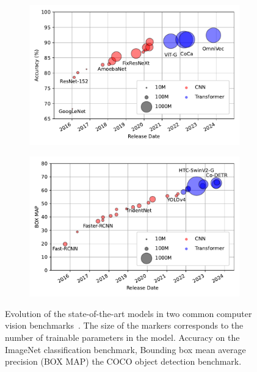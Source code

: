 \begin{figure}
    \centering
    \begin{subfigure}[b]{0.49\textwidth}
        \centering
        \includegraphics[width=\textwidth]{Figures/transformers/imagenet.pdf}
        \caption{}
        \label{fig:imagenet}
    \end{subfigure}
    \hfill
    \begin{subfigure}[b]{0.49\textwidth}
        \centering
        \includegraphics[width=\textwidth]{Figures/transformers/coco.pdf}
        \caption{}
        \label{fig:coco}
    \end{subfigure}
    \caption{Evolution of the state-of-the-art models in two common computer vision benchmarks~\cite{paperswithcode}. The size of the markers corresponds to the number of trainable parameters in the model.  Accuracy on the ImageNet classification benchmark,  Bounding box mean average precision (BOX MAP) the COCO object detection benchmark.}
    \label{fig:benchmarks}
\end{figure}

